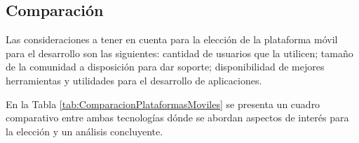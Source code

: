     \subsection{Comparación}
        \par Las consideraciones a tener en cuenta para la elección de la plataforma móvil para el desarrollo son las siguientes: cantidad de usuarios que la utilicen; tamaño de la comunidad a disposición para dar soporte; disponibilidad de mejores herramientas y utilidades para el desarrollo de aplicaciones.
        
        \par En la Tabla \ref{tab:ComparacionPlataformasMoviles} se presenta un cuadro comparativo entre ambas tecnologías dónde se abordan aspectos de interés para la elección y un análisis concluyente.
        

